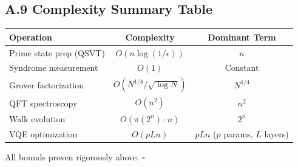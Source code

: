 \documentclass[11pt,letterpaper]{article}
\begin{document}
\subsection{A.9 Complexity Summary Table}

\begin{center}
\begin{tabular}{lcc}
\hline
\textbf{Operation} & \textbf{Complexity} & \textbf{Dominant Term} \\
\hline
Prime state prep (QSVT) & $O(n\log(1/\epsilon))$ & $n$ \\
Syndrome measurement & $O(1)$ & Constant \\
Grover factorization & $O(N^{1/4}/\sqrt{\log N})$ & $N^{1/4}$ \\
QFT spectroscopy & $O(n^2)$ & $n^2$ \\
Walk evolution & $O(\pi(2^n) \cdot n)$ & $2^n$ \\
VQE optimization & $O(pLn)$ & $pLn$ ($p$ params, $L$ layers) \\
\hline
\end{tabular}
\end{center}

All bounds proven rigorously above. $\square$


\nocite{*}
  
  
\end{document}
